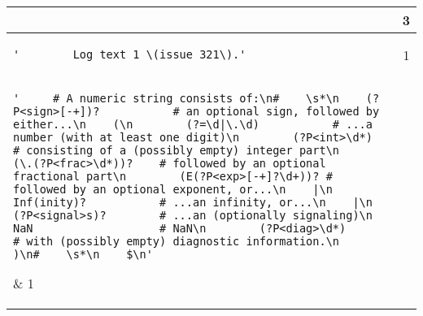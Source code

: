 \begin{table}
\begin{center}
\begin{tabular}{lc}
\begin{minipage}{2.4in}
\end{minipage}
& 3 \\ 
\midrule
\begin{minipage}{2.4in}
\begin{verbatim}
'        Log text 1 \(issue 321\).'\end{verbatim}
\end{minipage}
& 1 \\ 
\midrule
\begin{minipage}{2.4in}
\begin{verbatim}
'     # A numeric string consists of:\n#    \s*\n    (?P<sign>[-+])?           # an optional sign, followed by either...\n    (\n        (?=\d|\.\d)           # ...a number (with at least one digit)\n        (?P<int>\d*)          # consisting of a (possibly empty) integer part\n        (\.(?P<frac>\d*))?    # followed by an optional fractional part\n        (E(?P<exp>[-+]?\d+))? # followed by an optional exponent, or...\n    |\n        Inf(inity)?           # ...an infinity, or...\n    |\n        (?P<signal>s)?        # ...an (optionally signaling)\n        NaN                   # NaN\n        (?P<diag>\d*)         # with (possibly empty) diagnostic information.\n    )\n#    \s*\n    $\n'\end{verbatim}
\end{minipage}
& 1 \\ 
\midrule
\begin{minipage}{2.4in}
\begin{verbatim}
'    # A numeric string consists of:\n    (?P<sign>[-+])?          # an optional sign, followed by\n    (?=\d|\.\d)              # a number with at least one digit\n    (?P<int>\d*)             # having a (possibly empty) integer part\n    (?:\.(?P<frac>\d*))?     # followed by an optional fractional part\n    (?:E(?P<exp>[-+]?\d+))?  # and an optional exponent\n    \Z\n'\end{verbatim}
\end{minipage}
& 2 \\ 
\midrule
\begin{minipage}{2.4in}
\begin{verbatim}
'    # indirect offset\n                ^\(\n                (?P<base>&?0                  # just zero\n                        |&?[1-9]{1,1}[0-9]* # decimal\n                        |&?0[0-7]*          # octal\n                        |&?0x[0-9A-F]+      # hex\n                )\n                (?P<type>\n                        \.         # this dot might be alone\n                        [BSL]? # one of this chars in either case\n                )?\n                (?P<sign>\n                        [-+]{0,1}\n                )?\n                (?P<off>0              # just zero\n                        |[1-9]{1,1}[0-9]*  # decimal\n                        |0[0-7]*           # octal\n                        |0x[0-9a-f]+       # hex\n                )?\n                \)$'\end{verbatim}

\end{minipage}
\end{tabular}
\end{center}
\end{table}

